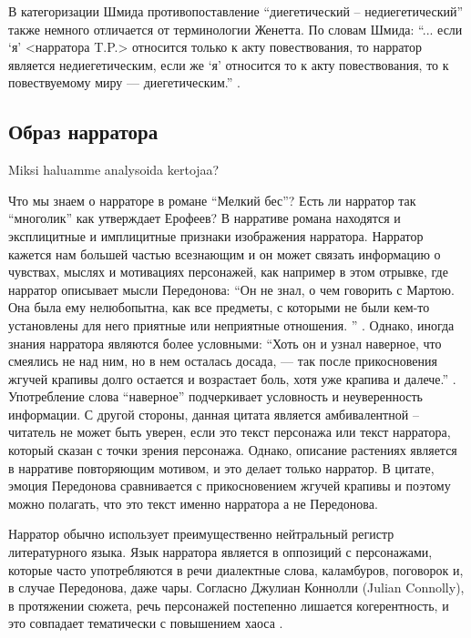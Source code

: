 \documentclass[12pt,a4paper]{article}
\begin{document}
В категоризации Шмида противопоставление \enquote{диегетический -- недиегетический} также немного отличается от терминологии Женетта. По словам Шмида: \enquote{... если \enquote{я} <нарратора T.P.> относится только к акту повествования, то нарратор является недиегетическим, если же \enquote{я} относится то к акту повествования, то к повествуемому миру — диегетическим.} \parencite[84]{schmid2008}.


\subsection{Образ нарратора}

Miksi haluamme analysoida kertojaa? 

Что мы знаем о нарраторе в романе \enquote{Мелкий бес}?
Есть ли нарратор так \enquote{многолик} как утверждает Ерофеев? В нарративе романа находятся и эксплицитные и имплицитные признаки изображения нарратора. Нарратор кажется нам большей частью всезнающим и он может связать информацию о чувствах, мыслях и мотивациях персонажей, как например в этом отрывке, где нарратор описывает мысли Передонова:  \enquote{Он не знал, о чем говорить с Мартою. Она была ему нелюбопытна,
как все предметы, с которыми не были кем-то установлены для него
приятные или неприятные отношения.
} \parencite[18]{sologub2004}. Однако, иногда знания нарратора являются более условными: \enquote{Хоть он и узнал наверное, что смеялись не над ним, но в нем осталась досада, — так после прикосновения жгучей крапивы долго остается и  возрастает боль, хотя уже крапива и далече.} \parencite[19]{sologub2004}. Употребление слова \enquote{наверное} подчеркивает условность и неуверенность информации. С другой стороны, данная цитата является амбивалентной – читатель не может быть уверен, если это текст персонажа или текст нарратора, который сказан с точки зрения персонажа. Однако, описание растениях является в нарративе повторяющим мотивом, и это делает только нарратор. В цитате, эмоция Передонова сравнивается с прикосновением жгучей крапивы и поэтому можно полагать, что это текст именно нарратора а не Передонова.

Нарратор обычно использует преимущественно нейтральный регистр литературного языка. Язык нарратора является в оппозиций с персонажами, которые часто употребляются в речи диалектные слова, каламбуров, поговорок и, в случае Передонова, даже чары. Согласно Джулиан Коннолли (Julian Connolly), в протяжении сюжета, речь персонажей постепенно лишается когерентность, и это совпадает тематически с повышением хаоса \parencite[358--359]{connolly1981}.
\end{document}
